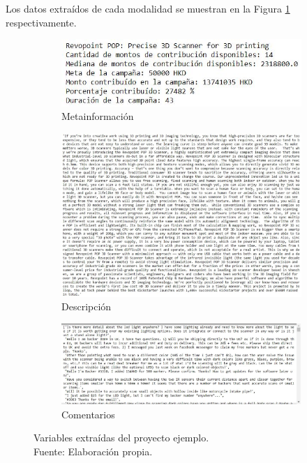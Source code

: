 Los datos extraídos de cada modalidad se muestran en la Figura \ref{4:fig31} respectivamente.
\begin{figure}[!ht]
	\centering
	\small
	\begin{subfigure}{.35\textwidth}
		\centering
		\includegraphics[width=0.95\linewidth]{5/figures/metadata_scraped_project.jpg}
		\caption{Metainformación}
	\end{subfigure}%
	\begin{subfigure}{.35\textwidth}
		\centering
		\includegraphics[width=0.95\linewidth]{5/figures/description_scraped_project.jpg}
		\caption{Descripción}
	\end{subfigure}%
	\begin{subfigure}{.35\textwidth}
		\centering
		\includegraphics[width=0.95\linewidth]{5/figures/comments_scraped_project.jpg}
		\caption{Comentarios}
	\end{subfigure}
	\caption[Variables extraídas del proyecto ejemplo]{Variables extraídas del proyecto ejemplo.\\
		Fuente: Elaboración propia.}
	\label{4:fig31}
\end{figure}

